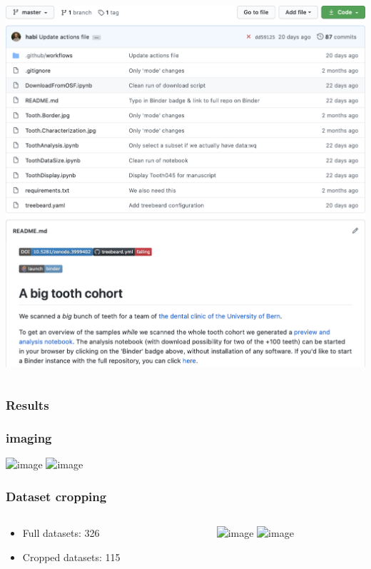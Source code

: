 \begin{frame}
\begin{columns}
\begin{column}{0.5\linewidth}
{				\href{https://mybinder.org/v2/gh/habi/zmk-tooth-cohort/master?filepath=ToothAnalysis.ipynb}{\includegraphics[height=\imageheight]{./images/zmk/binder}}%
				}%
		\end{column}
	\end{columns}
\end{frame}

\subsubsection{Results}
\renewcommand{\imageheight}{0.618\paperheight}
\begin{frame}
	\frametitle{\uct imaging}
	\centering
	\includegraphics<1|handout:0>[height=\imageheight]{./images/zmk/ScanOverviews.104.png}%
	\includegraphics<2>[height=\imageheight]{./images/zmk/ScanOverviews.24.png}%
\end{frame}

\renewcommand{\imagewidth}{\linewidth}
\begin{frame}
	\frametitle{Dataset cropping}
	\begin{columns}
		\begin{column}{0.382\linewidth}
			\begin{itemize}
				\item Full datasets: \qty{326}{\giga\byte}%
				\item<2> Cropped datasets: \qty{115}{\giga\byte}%
			\end{itemize}
		\end{column}
		\begin{column}{0.618\linewidth}
			\centering%
			\includegraphics<1|handout:1>[width=\imagewidth]{./images/zmk/tooth045/Tooth045.Cropper.Original.png}%
			\includegraphics<2|handout:2>[width=\imagewidth]{./images/zmk/tooth045/Tooth045.Cropper.Cropped.png}%
		\end{column}
	\end{columns}
\end{frame}

